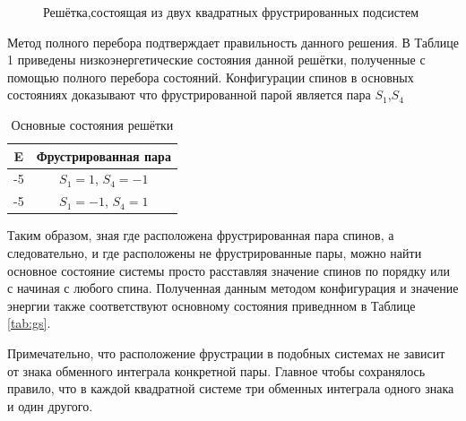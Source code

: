 \documentclass[utf8, babel, sor, jor, amsmath,amssymb, reprint]{elsarticle} %
\begin{document}
\begin{figure}[h]
	\centering
	\caption{Решётка,состоящая из двух квадратных фрустрированных подсистем}
	\label{fig:label}
\end{figure}


Метод полного перебора подтверждает правильность данного решения. В Таблице 1 приведены низкоэнергетические состояния данной решётки, полученные с помощью полного перебора состояний. Конфигурации спинов в основных состояниях доказывают что фрустрированной парой является пара $S_1$,$S_4$

\begin{table}[h]
	\centering
	\begin{tabular}{|c|c|}
		\hline
		 E   &   Фрустрированная пара \\
		 \hline
		-5   &  $S_1=1$, $S_4=-1$ \\
		\hline
		-5   &   $S_1=-1$, $S_4=1$ \\
		\hline
	\end{tabular}
	\caption{Основные состояния решётки}
	\label{tab:gs}
\end{table}

Таким образом, зная где расположена фрустрированная пара спинов, а следовательно, и где расположены не фрустрированные пары, можно найти основное состояние системы просто расставляя значение спинов по порядку или с начиная с любого спина. Полученная данным методом конфигурация и значение энергии также соответствуют основному состояния приведнном в Таблице \eqref{tab:gs}.

Примечательно, что расположение фрустрации в подобных системах не зависит от знака обменного интеграла конкретной пары. Главное чтобы сохранялось правило, что в каждой квадратной системе три обменных интеграла одного знака и один другого. 
\end{document}
